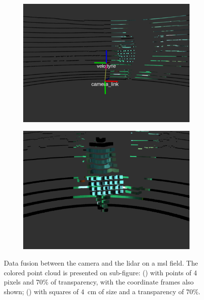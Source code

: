 \begin{figure}[!ht]
	\centering
	\begin{subfigure}[t]{0.45\textwidth}
		\includegraphics[width=\textwidth]{img/sensor_fusion/cambada_fusion_points.png}
		\caption{}
		\label{fig:sensor-fusion:cambada-points}
	\end{subfigure}
	\qquad
	\begin{subfigure}[t]{0.45\textwidth}
		\includegraphics[width=\textwidth]{img/sensor_fusion/cambada_fusion_squares.png}
	\caption{}%
		\label{fig:sensor-fusion:cambada-squares}
	\end{subfigure}
	\caption[Colored point clouds computed for the datasets on \ac{irislab}.]{Data fusion between the camera and the \ac{lidar} on a \ac{msl} field. The colored point cloud is presented on sub-figure: () with points of 4 pixels and 70\% of transparency, with the coordinate frames also shown; () with squares of \SI{4}{\centi\meter} of size and a transparency of 70\%.}
	\label{fig:cambada-sensor-fusion}
\end{figure}

